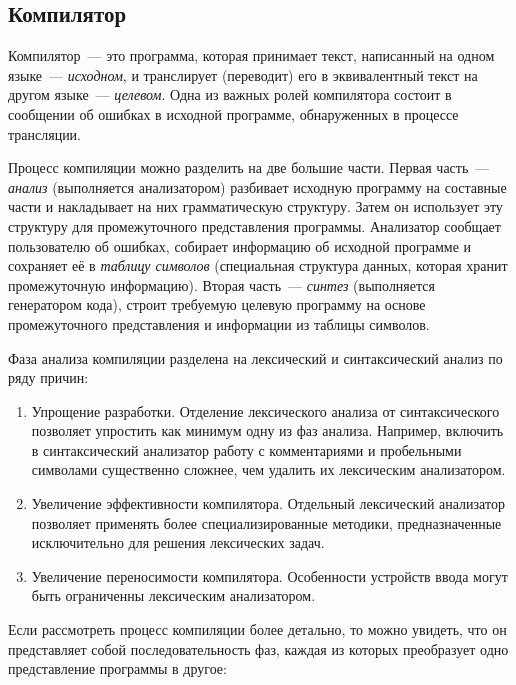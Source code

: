 \subsection{Компилятор} \label{sub111}

Компилятор~--- это программа, которая  принимает текст, написанный на одном языке~--- \textit{исходном}, и транслирует (переводит) его в эквивалентный текст на другом языке~--- \textit{целевом}. Одна из важных ролей компилятора состоит в сообщении об ошибках в исходной программе, обнаруженных в процессе трансляции.

Процесс компиляции можно разделить на две большие части. Первая часть~--- \textit{анализ} (выполняется анализатором) разбивает исходную программу на составные части и накладывает на них грамматическую структуру. Затем он использует эту структуру для промежуточного представления программы. Анализатор сообщает пользователю об ошибках, собирает информацию об исходной программе и сохраняет её в \textit{таблицу символов} (специальная структура данных, которая хранит промежуточную информацию). Вторая часть~--- \textit{синтез} (выполняется генератором кода), строит требуемую целевую программу на основе промежуточного представления и информации из таблицы символов.

Фаза анализа компиляции разделена на лексический и синтаксический анализ по ряду причин: 

\begin{enumerate} 
	\item{Упрощение разработки. Отделение лексического анализа от синтаксического позволяет упростить как минимум одну из фаз анализа. Например, включить в синтаксический анализатор работу с комментариями и пробельными символами существенно сложнее, чем удалить их лексическим анализатором.}
	\item{Увеличение эффективности компилятора. Отдельный лексический анализатор позволяет применять более специализированные методики, предназначенные исключительно для решения лексических задач.}
	\item{Увеличение переносимости компилятора. Особенности устройств ввода могут быть ограниченны лексическим анализатором.}
\end{enumerate}

Если рассмотреть процесс компиляции более детально, то можно увидеть, что он представляет собой последовательность фаз, каждая из которых преобразует одно представление программы в другое:

